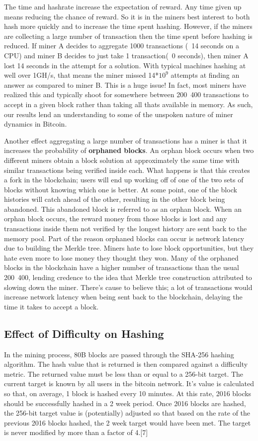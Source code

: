 \documentclass[pdftex,11pt]{article}
\begin{document}
The time and hashrate increase the expectation of reward. Any time given up means reducing the chance of reward. So it is in the miners best interest to both hash more quickly and to increase the time spent hashing. However, if the miners are collecting a large number of transaction then the time spent before hashing is reduced. If miner A decides to aggregate 1000 transactions (~14 seconds on a CPU) and miner B decides to just take 1 transaction(~0 seconds), then miner A lost 14 seconds in the attempt for a solution. With typical machines hashing at well over 1GH/s, that means the miner missed 14*$10^{9}$ attempts at finding an answer as compared to miner B. This is a huge issue! In fact, most miners have realized this and typically shoot for somewhere between 200~400 transactions to accept in a given block rather than taking all thats available in memory. As such, our results lend an understanding to some of the unspoken nature of miner dynamics in Bitcoin.

Another effect aggregating a large number of transactions has a miner is that it increases the probability of {\bf orphaned blocks}. An orphan block occurs when two different miners obtain a block solution at approximately the same time with similar transactions being verified inside each. What happens is that this creates a fork in the blockchain; users will end up working off of one of the two sets of blocks without knowing which one is better. At some point, one of the block histories will catch ahead of the other, resulting in the other block being abandoned. This abandoned block is referred to as an orphan block. When an orphan block occurs, the reward money from those blocks is lost and any transactions inside them not verified by the longest history are sent back to the memory pool. Part of the reason orphaned blocks can occur is network latency due to building the Merkle tree. Miners hate to lose block opportunities, but they hate even more to lose money they thought they won. Many of the orphaned blocks in the blockchain have a higher number of transactions than the usual 200~400, lending credence to the idea that Merkle tree construction attributed to slowing down the miner. There's cause to believe this; a lot of transactions would increase network latency when being sent back to the blockchain, delaying the time it takes to accept a block.

\subsection{Effect of Difficulty on Hashing}
In the mining process, 80B blocks are passed through the SHA-256 hashing algorithm. The hash value that is returned is then compared against a difficulty metric. The returned value must be less than or equal to a 256-bit target. The current target is known by all users in the bitcoin network. It's value is calculated so that, on average, 1 block is hashed every 10 minutes. At this rate, 2016 blocks should be successfully hashed in a 2 week period. Once 2016 blocks are hashed, the 256-bit target value is (potentially) adjusted so that based on the rate of the previous 2016 blocks hashed, the 2 week target would have been met. The target is never modified by more than a factor of 4.[7]
\end{document}

